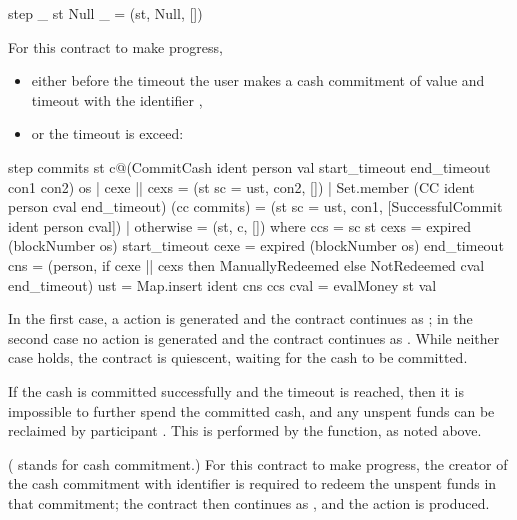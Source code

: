 \documentclass[runningheads]{llncs}
\begin{document}
\begin{haskellcode}
step _ st Null _ = (st, Null, [])
\end{haskellcode}

\smallskip
\noindent
{}  For this contract to make 
progress,\begin{itemize}
\item either before the timeout  the user  makes a cash commitment of 
value 
 and timeout   with the identifier , 
\item
or the timeout  is exceed:
\end{itemize} 

\begin{haskellcode}
step 
  commits 
  st 
  c@(CommitCash ident person val start_timeout end_timeout con1 con2) 
  os
  | cexe || cexs = (st {sc = ust}, con2, [])
  | Set.member (CC ident person cval end_timeout) (cc commits)
        = (st {sc = ust}, con1, [SuccessfulCommit ident person cval])
  | otherwise = (st, c, [])
  where ccs = sc st
        cexs = expired (blockNumber os) start_timeout
        cexe = expired (blockNumber os) end_timeout
        cns = (person, if cexe || cexs 
                          then ManuallyRedeemed 
                          else NotRedeemed cval end_timeout)
        ust = Map.insert ident cns ccs
        cval = evalMoney st val
\end{haskellcode}
In the first case, a  action is generated and the contract continues as 
; in the second case no action is generated and the contract continues as 
. While neither case holds, the contract is quiescent, waiting for the cash to be committed. 

If the cash is committed successfully and the timeout  is reached, then it is impossible to 
further spend the committed cash, and any unspent funds can be reclaimed by participant .
 This is performed by the  function, as noted above.

\medskip
\noindent
{} ( stands for cash commitment.) For this contract to make 
progress, the creator of the cash commitment with identifier  is required to redeem the unspent 
funds in that commitment; the contract then continues as , and the action 
 is produced. 
\end{document}
